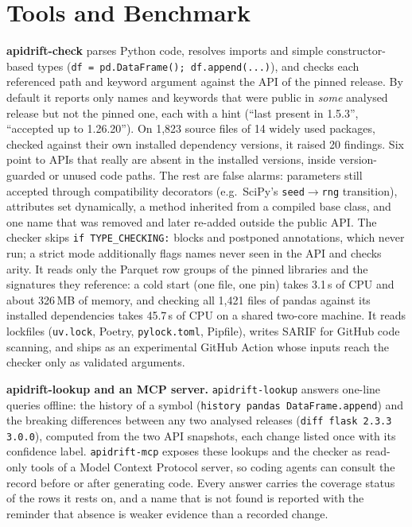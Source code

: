 \documentclass[10pt,twocolumn,letterpaper]{article}
\begin{document}
\section{Tools and Benchmark}\label{sec:tools}
\textbf{apidrift-check} parses Python code, resolves imports and simple constructor-based types
(\texttt{df = pd.DataFrame(); df.append(...)}), and checks each referenced path and keyword argument against the
API of the pinned release. By default it reports only names and keywords that were public in \emph{some}
analysed release but not the pinned one, each with a hint (``last present in 1.5.3'', ``accepted up to
1.26.20''). On 1,823 source files of 14 widely used packages, checked against their own installed
dependency versions, it raised 20 findings. Six point to APIs that really are absent in the installed
versions, inside version-guarded or unused code paths. The rest are false alarms: parameters still accepted
through compatibility decorators (e.g.\ SciPy's \texttt{seed}$\to$\texttt{rng} transition), attributes set
dynamically, a method inherited from a compiled base class, and one name that was removed and later re-added outside
the public API. The checker skips \texttt{if TYPE\_CHECKING:} blocks and postponed annotations, which never run; a
strict mode additionally flags names never seen in the API and checks arity. It reads only the Parquet row groups of
the pinned libraries and the signatures they reference: a cold start (one file, one pin) takes 3.1\,s of
CPU and about 326\,MB of memory, and checking all 1,421 files of pandas against its installed
dependencies takes 45.7\,s of CPU on a shared two-core machine. It reads lockfiles (\texttt{uv.lock},
Poetry, \texttt{pylock.toml}, Pipfile), writes SARIF for GitHub code scanning, and ships as an experimental GitHub
Action whose inputs reach the checker only as validated arguments.

\textbf{apidrift-lookup and an MCP server.} \texttt{apidrift-lookup} answers one-line queries offline: the history
of a symbol (\texttt{history pandas DataFrame.append}) and the breaking differences between any two analysed releases
(\texttt{diff flask 2.3.3 3.0.0}), computed from the two API snapshots, each change listed once with its confidence
label. \texttt{apidrift-mcp} exposes these lookups and the checker as read-only tools of a Model Context Protocol
server, so coding agents can consult the record before or after generating code. Every answer carries the coverage
status of the rows it rests on, and a name that is not found is reported with the reminder that absence is weaker
evidence than a recorded change.
\end{document}
